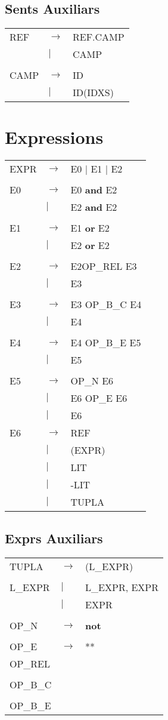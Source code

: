 \documentclass{article}
\begin{document}
	\subsection{Sents Auxiliars}
	\begin{tabular}{l l l}
		REF&$\to$&REF.CAMP\\
		&$|$&CAMP\\
		\\
		CAMP&$\to$&ID\\
		&$|$&ID(IDXS)
	\end{tabular}
	\section{Expressions}
	\begin{tabular}{l l l}
		EXPR&$\to$&E0 | E1 | E2\\
		\\
		E0&$\to$&E0 \textbf{and} E2\\
		&$|$&E2 \textbf{and} E2\\
		\\
		E1&$\to$&E1 \textbf{or} E2\\
		&$|$&E2 \textbf{or} E2\\
		\\
		E2&$\to$&E2OP\_REL E3\\
		&$|$&E3\\
		\\
		E3&$\to$&E3 OP\_B\_C E4\\
		&$|$&E4\\
		\\
		E4&$\to$&E4 OP\_B\_E E5\\
		&$|$&E5\\
		\\
		E5&$\to$&OP\_N E6\\
		&$|$&E6 OP\_E E6\\
		&$|$&E6
		\\
		E6&$\to$&REF\\
		&$|$&(EXPR)\\
		&$|$&LIT\\
		&$|$&-LIT\\
		&$|$&TUPLA
	\end{tabular}
	\subsection{Exprs Auxiliars}
	\begin{tabular}{l l l}
		TUPLA&$\to$&(L\_EXPR)\\
		\\
		L\_EXPR&$|$&L\_EXPR, EXPR\\
		&$|$&EXPR\\
		\\
		OP\_N&$\to$&\textbf{not}\\
		\\
		OP\_E&$\to$&**
		\\
		OP\_REL\\
		\\
		OP\_B\_C\\
		\\
		OP\_B\_E
	\end{tabular}
\end{document}
